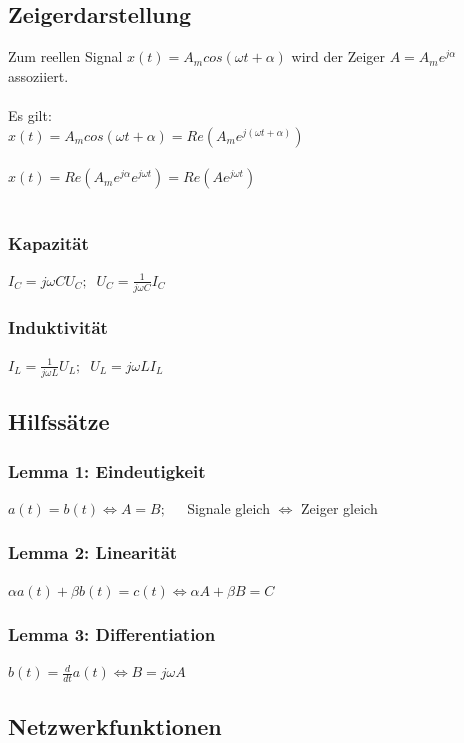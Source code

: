 \documentclass[a4paper,twocolumn,10pt]{article}
\begin{document}
\subsection*{Zeigerdarstellung}
Zum reellen Signal $x(t)=A_m cos(\omega t+\alpha)$ wird der Zeiger $A=A_m e^{j\alpha}$ assoziiert.\\\\
Es gilt:\\
$x(t)=A_m cos(\omega t+\alpha)=Re(A_m e^{j(\omega t+\alpha)})$\\\\
$x(t)=Re(A_m e^{j\alpha}e^{j\omega t})=Re(Ae^{j\omega t})$\\\\
\begin{minipage}[t]{0.23\textwidth}
\subsubsection*{Kapazität}
$I_C=j\omega CU_C;\;\;U_C=\frac{1}{j\omega C}I_C$
\end{minipage}
\hfill
\begin{minipage}[t]{0.23\textwidth}
\subsubsection*{Induktivität}
$I_L=\frac{1}{j\omega L}U_L;\;\;U_L=j\omega LI_L$
\end{minipage}
\subsection*{Hilfssätze}
\subsubsection*{Lemma 1: Eindeutigkeit}
$a(t)=b(t)\Leftrightarrow A=B;\;\;\;\;$ Signale gleich $\Leftrightarrow$ Zeiger gleich
\subsubsection*{Lemma 2: Linearität}
$\alpha a(t)+\beta b(t)=c(t)\Leftrightarrow \alpha A+\beta B=C$
\subsubsection*{Lemma 3: Differentiation}
$b(t)=\frac{d}{dt}a(t)\Leftrightarrow B=j\omega A$
\subsection*{Netzwerkfunktionen}
\end{document}
